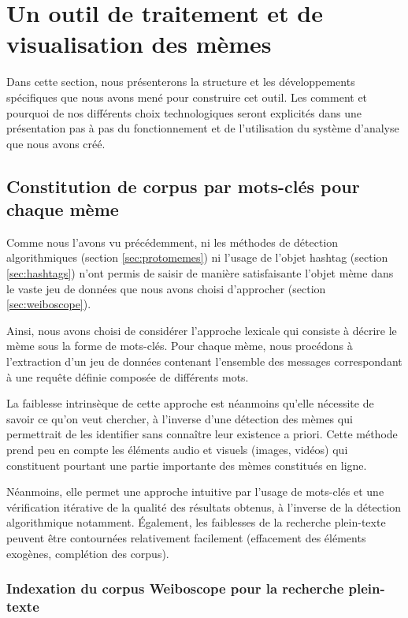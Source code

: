 \section{Un outil de traitement et de visualisation des mèmes}

Dans cette section, nous présenterons la structure et les développements spécifiques que nous avons mené pour construire cet outil. Les comment et pourquoi de nos différents choix technologiques seront explicités dans une présentation pas à pas du fonctionnement et de l'utilisation du système d'analyse que nous avons créé.

\subsection[Constitution de corpus par mots-clés pour chaque mème]{Constitution de corpus par mots-clés pour chaque mème}
\label{sec:keywords}

Comme nous l'avons vu précédemment,  ni les méthodes de détection algorithmiques (section \ref{sec:protomemes}) ni l'usage de l'objet hashtag (section \ref{sec:hashtags}) n'ont permis de saisir de manière satisfaisante l'objet mème dans le vaste jeu de données que nous avons choisi d'approcher (section \ref{sec:weiboscope}). 

Ainsi, nous avons choisi de considérer l'approche lexicale qui consiste à décrire le mème sous la forme de mots-clés. Pour chaque mème, nous procédons à l{\textquoteright}extraction d{\textquoteright}un jeu de données contenant l{\textquoteright}ensemble des messages correspondant à une requête définie composée de différents mots. 

La faiblesse intrinsèque de cette approche est néanmoins qu'elle nécessite de savoir ce qu'on veut chercher, à l'inverse d'une détection des mèmes qui permettrait de les identifier sans connaître leur existence a priori. Cette méthode prend peu en compte les éléments audio et visuels (images, vidéos) qui constituent pourtant une partie importante des mèmes constitués en ligne. 

Néanmoins, elle permet une approche intuitive par l'usage de mots-clés et une vérification itérative de la qualité des résultats obtenus, à l'inverse de la détection algorithmique notamment. Également, les faiblesses de la recherche plein-texte peuvent être contournées relativement facilement (effacement des éléments exogènes, complétion des corpus). 


\subsubsection[Indexation pour la recherche plein-texte]{Indexation du corpus Weiboscope pour la recherche plein-texte}

